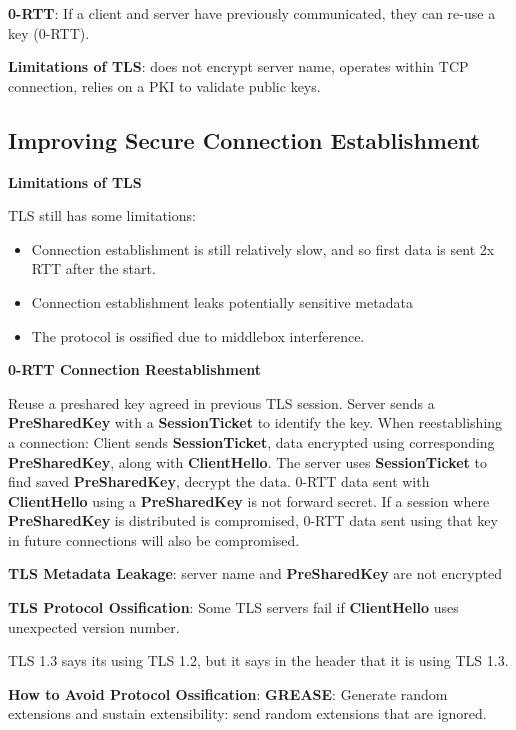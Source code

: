 \documentclass{article}
\begin{document}
\textbf{0-RTT}: If a client and server have previously communicated, they can re-use a key (0-RTT).

\textbf{Limitations of TLS}: does not encrypt server name, operates within TCP connection, relies on a PKI to validate public keys.


\clearpage

\subsection*{Improving Secure Connection Establishment}

\textbf{Limitations of TLS}

TLS still has some limitations:
\begin{itemize}
    \item Connection establishment is still relatively slow, and so first data is sent 2x RTT after the start.
    \item Connection establishment leaks potentially sensitive metadata
    \item The protocol is ossified due to middlebox interference.
\end{itemize}

\textbf{0-RTT Connection Reestablishment}

Reuse a preshared key agreed in previous TLS session.
Server sends a \textbf{PreSharedKey} with a \textbf{SessionTicket} to identify the key.
When reestablishing a connection: Client sends \textbf{SessionTicket}, data encrypted using corresponding
\textbf{PreSharedKey}, along with \textbf{ClientHello}. The server uses \textbf{SessionTicket} to find saved \textbf{PreSharedKey},
decrypt the data.
0-RTT data sent with \textbf{ClientHello} using a \textbf{PreSharedKey} is not forward secret.
If a session where \textbf{PreSharedKey} is distributed is compromised,
0-RTT data sent using that key in future connections will also be compromised.

\textbf{TLS Metadata Leakage}: server name and \textbf{PreSharedKey} are not encrypted

\textbf{TLS Protocol Ossification}: Some TLS servers fail if \textbf{ClientHello} uses unexpected version number.

TLS 1.3 says its using TLS 1.2, but it says in the header that it is using TLS 1.3.

\textbf{How to Avoid Protocol Ossification}:
\textbf{GREASE}: Generate random extensions and sustain extensibility: send random extensions that are ignored.
\end{document}
